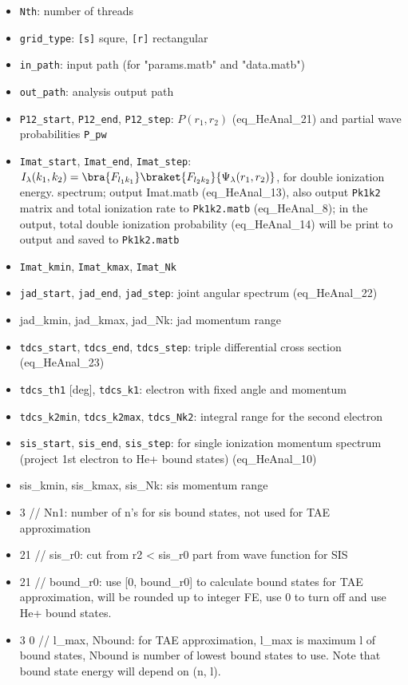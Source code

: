 
\begin{itemize}
\item \verb`Nth`: number of threads
\item \verb`grid_type`: \verb`[s]` squre, \verb`[r]` rectangular
\item \verb`in_path`: input path (for "params.matb" and "data.matb")
\item \verb`out_path`: analysis output path

\item \verb`P12_start`, \verb`P12_end`, \verb`P12_step`: $P(r_1, r_2)$ (eq_HeAnal_21) and partial wave probabilities \verb`P_pw`

\item \verb`Imat_start`, \verb`Imat_end`, \verb`Imat_step`: $I_\lambda(k_1, k_2) = \bra{F_{l_1k_1}}\braket{F_{l_2k_2}}{\Psi_\lambda(r_1,r_2)}$, for double ionization energy. spectrum; output Imat.matb (eq_HeAnal_13), also output \verb`Pk1k2` matrix and total ionization rate to \verb`Pk1k2.matb` (eq_HeAnal_8); in the output, total double ionization probability (eq_HeAnal_14) will be print to output and saved to \verb`Pk1k2.matb`
\item \verb`Imat_kmin`, \verb`Imat_kmax`, \verb`Imat_Nk`

\item \verb`jad_start`, \verb`jad_end`, \verb`jad_step`: joint angular spectrum (eq_HeAnal_22)
\item jad_kmin, jad_kmax, jad_Nk: jad momentum range

\item \verb`tdcs_start`, \verb`tdcs_end`, \verb`tdcs_step`: triple differential cross section (eq_HeAnal_23)
\item \verb`tdcs_th1` [deg], \verb`tdcs_k1`: electron with fixed angle and momentum
\item \verb`tdcs_k2min`, \verb`tdcs_k2max`, \verb`tdcs_Nk2`: integral range for the second electron

\item \verb`sis_start`, \verb`sis_end`, \verb`sis_step`: for single ionization momentum spectrum (project 1st electron to He+ bound states) (eq_HeAnal_10)
\item sis_kmin, sis_kmax, sis_Nk: sis momentum range
\item 3               // Nn1: number of n's for sis bound states, not used for TAE approximation
\item 21              // sis_r0: cut from r2 < sis_r0 part from wave function for SIS
\item 21              // bound_r0: use [0, bound_r0] to calculate bound states for TAE approximation, will be rounded up to integer FE, use 0 to turn off and use He+ bound states.
\item 3   0           // l_max, Nbound: for TAE approximation, l_max is maximum l of bound states, Nbound is number of lowest bound states to use. Note that bound state energy will depend on (n, l).


\end{itemize}
